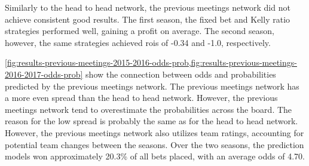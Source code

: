 Similarly to the head to head network, the previous meetings network did not achieve consistent good results. The first season, the fixed bet and Kelly ratio strategies performed well, gaining a profit on average. The second season, however, the same strategies achieved \glspl{roi} of -0.34 and -1.0, respectively.

\cref{fig:results-previous-meetings-2015-2016-odds-prob,fig:results-previous-meetings-2016-2017-odds-prob} show the connection between odds and probabilities predicted by the previous meetings network. The previous meetings network has a more even spread than the head to head network. However, the previous meetings network tend to overestimate the probabilities across the board. The reason for the low spread is probably the same as for the head to head network. However, the previous meetings network also utilizes team ratings, accounting for potential team changes between the seasons. Over the two seasons, the prediction models won approximately 20.3\% of all bets placed, with an average odds of 4.70.